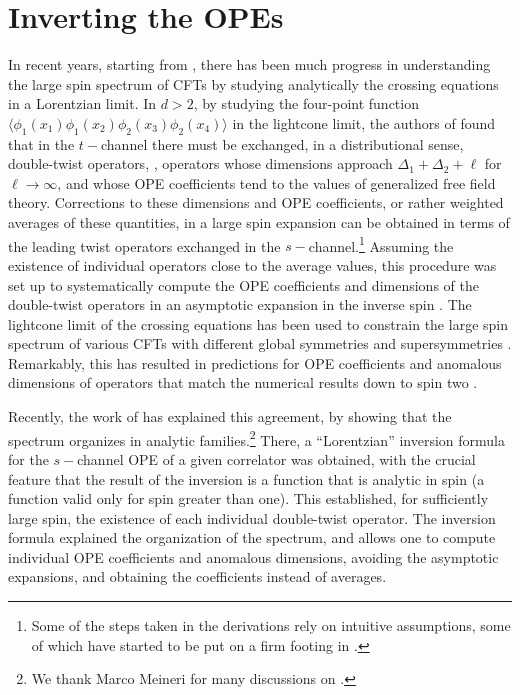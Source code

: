 \section{Inverting the OPEs}
\label{sec:anlytical}

In recent years, starting from \cite{Fitzpatrick:2012yx,Komargodski:2012ek}, there has been much progress in understanding the large spin spectrum of CFTs by studying analytically the crossing equations in a Lorentzian limit.
In $d >2$, by studying 
the four-point function $\langle \phi_1(x_1) \phi_1(x_2) \phi_2(x_3) \phi_2(x_4) \rangle$ in the lightcone limit, the authors of \cite{Fitzpatrick:2012yx,Komargodski:2012ek} found that in the $t-$channel there must be exchanged, in a distributional sense, double-twist operators, \ie, operators whose dimensions approach $\Delta_1 + \Delta_2 + \ell$ for $\ell \to \infty$, and whose OPE coefficients tend to the values of generalized free field theory. Corrections to these dimensions and OPE coefficients, or rather weighted averages of these quantities, in a large spin expansion can be obtained in terms of the leading twist operators exchanged in the $s-$channel.\footnote{Some of the steps taken in the derivations \cite{Fitzpatrick:2012yx,Komargodski:2012ek} rely on intuitive assumptions, some of which have started to be put on a firm footing in \cite{Qiao:2017xif}.} 
Assuming the existence of individual operators close to the average values, this procedure was set up to systematically compute the OPE coefficients and dimensions of the double-twist operators in an asymptotic expansion in the inverse spin \cite{Alday:2015ewa}.
The lightcone limit of the crossing equations has been used to constrain the large spin spectrum of various CFTs with different global symmetries and supersymmetries \cite{Fitzpatrick:2012yx,Komargodski:2012ek,Alday:2013cwa,Fitzpatrick:2014vua,Vos:2014pqa,Fitzpatrick:2015qma,Kaviraj:2015cxa,Alday:2015eya,Kaviraj:2015xsa,Alday:2015ota,Beem:2015aoa,1612.03891,1603.05150,1611.01500,1612.00696,1510.08091,1602.04928,1511.08025}.
Remarkably, this has resulted in predictions for OPE coefficients and anomalous dimensions of operators that match the numerical results down to spin two \cite{Simmons-Duffin:2016wlq, Alday:2015ota}.

Recently, the work of \cite{Caron-Huot:2017vep} has explained this agreement, by showing that the spectrum organizes in analytic families.\footnote{We thank Marco Meineri for many discussions on \cite{Caron-Huot:2017vep}.} There, a ``Lorentzian'' inversion formula for the $s-$channel OPE of a given correlator was obtained, with the crucial feature that the result of the inversion is a function that is analytic in spin (a function valid only for spin greater than one). 
This established, for sufficiently large spin, the existence of each individual double-twist operator.
The inversion formula explained the organization of the spectrum, and allows one to compute individual OPE coefficients and anomalous dimensions, avoiding the asymptotic expansions, and obtaining the coefficients instead of averages.



